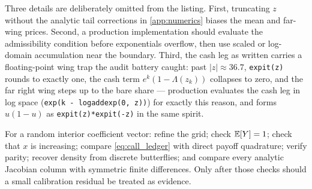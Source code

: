 \documentclass[11pt]{article}
\begin{document}
Three details are deliberately omitted from the listing.  First, truncating
$z$ without the analytic tail corrections in \cref{app:numerics} biases the
mean and far-wing prices.  Second, a production implementation should
evaluate the admissibility condition before exponentials overflow, then use
scaled or log-domain accumulation near the boundary.  Third, the cash leg
as written carries a floating-point wing trap the audit battery caught:
past $|z|\approx36.7$, \texttt{expit(z)} rounds to exactly one, the cash
term $e^{k}(1-\Lambda(z_k))$ collapses to zero, and the far right wing
steps up to the bare share --- production evaluates the cash leg in log
space (\texttt{exp(k - logaddexp(0, z))}) for exactly this reason, and
forms $u(1-u)$ as \texttt{expit(z)*expit(-z)} in the same spirit.

\begin{example}[title={What to test before optimizing}]
For a random interior coefficient vector: refine the grid; check
$\mathbb{E}[Y]=1$; check that $x$ is increasing; compare \eqref{eq:call_ledger} with
direct payoff quadrature; verify parity; recover density from discrete
butterflies; and compare every analytic Jacobian column with symmetric finite
differences.  Only after those checks should a small calibration residual be
treated as evidence.
\end{example}
\end{document}

